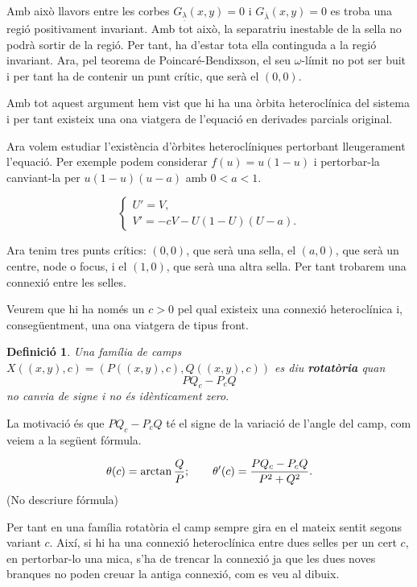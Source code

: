 \documentclass{article}
\newtheorem{definicio}{Definici\'{o}}
\theoremstyle{definition}
\begin{document}
Amb aix\`{o} llavors entre les corbes $G_{\underline\lambda}(x,y)=0$ i $G_{\overline\lambda}(x,y)=0$ es troba una regi\'{o} positivament invariant. Amb tot aix\`{o}, la separatriu inestable de la sella no podr\`{a} sortir de la regi\'{o}. Per tant, ha d'estar tota ella continguda a la regi\'{o} invariant. Ara, pel teorema de Poincar\'{e}-Bendixson, el seu $\omega$-l\'{i}mit no pot ser buit i per tant ha de contenir un punt cr\'{i}tic, que ser\`{a} el $(0,0)$.

Amb tot aquest argument hem vist que hi ha una \`{o}rbita heterocl\'{i}nica del sistema i per tant existeix una ona viatgera de l'equaci\'{o} en derivades parcials original.

Ara volem estudiar l'exist\`{e}ncia d'\`{o}rbites heterocl\'{i}niques pertorbant lleugerament l'equaci\'{o}. Per exemple podem considerar $f(u)=u(1-u)$ i pertorbar-la canviant-la per $u(1-u)(u-a)$ amb $0<a<1$.

\[\left\{\begin{array}{l}U'=V,\\V'=-cV-U(1-U)(U-a).\end{array}\right.\]

Ara tenim tres punts cr\'{i}tics: $(0,0)$, que ser\`{a} una sella, el $(a,0)$, que ser\`{a} un centre, node o focus, i el $(1,0)$, que ser\`{a} una altra sella. Per tant trobarem una connexi\'{o} entre les selles.

Veurem que hi ha nom\'{e}s un $c>0$ pel qual existeix una connexi\'{o} heterocl\'{i}nica i, conseg\"{u}entment, una ona viatgera de tipus front.

\begin{definicio}
Una fam\'{i}lia de camps $X((x,y),c)=(P((x,y),c),Q((x,y),c))$ es diu \textbf{rotat\`{o}ria} quan
\[PQ_c-P_cQ\]
no canvia de signe i no \'{e}s id\`{e}nticament zero.
\end{definicio}

La motivaci\'{o} \'{e}s que $PQ_c-P_cQ$ t\'{e} el signe de la variaci\'{o} de l'angle del camp, com veiem a la seg\"{u}ent f\'{o}rmula.

\[\theta(c)=\arctan\frac{Q}{P};\hspace{7mm}\theta'(c)=\frac{PQ_c-P_cQ}{P^2+Q^2}.\]
(No descriure f\'{o}rmula)

Per tant en una fam\'{i}lia rotat\`{o}ria el camp sempre gira en el mateix sentit segons variant $c$. Aix\'{i}, si hi ha una connexi\'{o} heterocl\'{i}nica entre dues selles per un cert $c$, en pertorbar-lo una mica, s'ha de trencar la connexi\'{o} ja que les dues noves branques no poden creuar la antiga connexi\'{o}, com es veu al dibuix.
\end{document}
